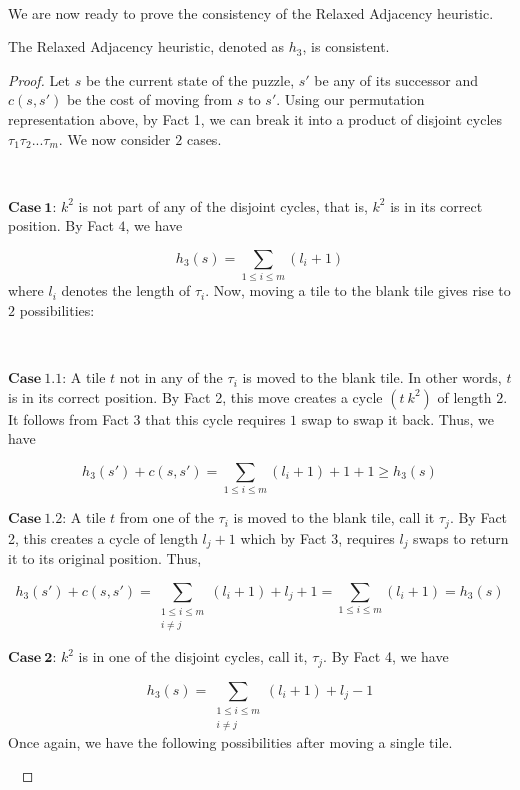 \documentclass[runningheads]{llncs}
\begin{document}
\

We are now ready to prove the consistency of the Relaxed Adjacency heuristic.

\begin{theorem}
The Relaxed Adjacency heuristic, denoted as $h_3$, is consistent.
\end{theorem}

\begin{proof}
Let $s$ be the current state of the puzzle, $s'$ be any of its successor and $c(s, s')$ be the cost of moving from $s$ to $s'$. Using our permutation representation above, by Fact 1, we can break it into a product of disjoint cycles $\tau_1 \tau_2 ... \tau_m$. We now consider $2$ cases.

\

$\mathbf{Case \ 1}$: $k^2$ is not part of any of the disjoint cycles, that is, $k^2$ is in its correct position. By Fact $4$, we have 

$$
h_3(s) = \sum_{1 \leq i \leq m} (l_{i} + 1)
$$
where $l_i$ denotes the length of $\tau_{i}$. Now, moving a tile to the blank tile gives rise to $2$ possibilities:

\

$\mathbf{Case \ 1.1}$: A tile $t$ not in any of the $\tau_i$ is moved to the blank tile. In other words, $t$ is in its correct position. By Fact 2, this move creates a cycle $(t \ k^{2})$ of length $2$. It follows from Fact 3 that this cycle requires $1$ swap to swap it back. Thus, we have

$$
h_3(s') + c(s, s') = \sum_{1 \leq i \leq m} (l_i + 1) + 1 + 1 \geq h_3(s)
$$

$\mathbf{Case \ 1.2}$: A tile $t$ from one of the $\tau_i$ is moved to the blank tile, call it $\tau_j$. By Fact 2, this creates a cycle of length $l_j + 1$ which by Fact 3, requires $l_j$ swaps to return it to its original position. Thus,

$$
h_3(s') + c(s, s') = \sum_{\substack{1 \leq i \leq m \\ i \neq j}} (l_i + 1) + l_j + 1 = \sum_{1 \leq i \leq m} (l_i + 1) = h_3(s)
$$

$\mathbf{Case \ 2}$: $k^2$ is in one of the disjoint cycles, call it, $\tau_j$. By Fact 4, we have

$$
h_3(s) = \sum_{\substack{1 \leq i \leq m \\ i \neq j}}(l_i + 1) + l_j - 1
$$
Once again, we have the following possibilities after moving a single tile.

\ 


\end{proof}
\end{document}
